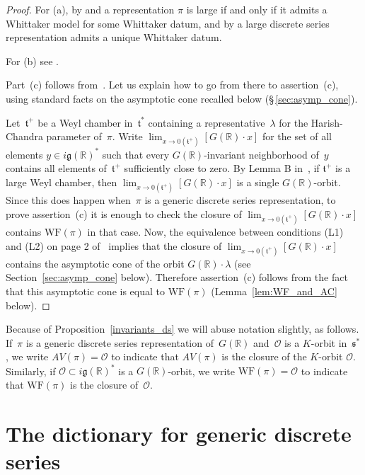 \documentclass[cupthm]{CUP-JNL-JMJ}
\numberwithin{equation}{section}
\theoremstyle{cupplain}
\theoremstyle{cupdefinition}
\theoremstyle{cupremark}
\theoremstyle{cupproof}
\newtheorem{proof}{Proof}
\renewcommand{\O}{\mathcal O}
\newcommand{\R}{\mathbb R}
\newcommand{\g}{\mathfrak g}
\newcommand{\s}{\mathfrak s}
\newcommand{\WF}{\mathrm{WF}}
\begin{document}
\begin{proof} For (a), by \cite{vogan-gelfand-kirillov} and \cite{kostant_whittaker}
a representation $\pi$ is large if and only if it admits a Whittaker model for some Whittaker datum,
and by \cite[Lemma 14.14]{abv} a  large discrete series representation admits a unique Whittaker datum.

For (b) see \cite[Proposition A.9]{AV1}.

Part~(c) follows from~\cite[Lemma B]{rossmann_limit_orbits}. Let us explain how to go from there to  assertion~(c), using standard facts on the asymptotic cone recalled below (\S\,{}\ref{sec:asymp_cone}).

Let~$\mathfrak{t}^+$ be a Weyl chamber in~$\mathfrak{t}^\ast$ containing a representative~$\lambda$ for the Harish-Chandra parameter of~$\pi$. Write $\lim_{x \to 0(\mathfrak{t}^+)}\left[ G(\R)\cdot x\right]$ for the set of all elements $y \in i\g(\R)^\ast$ such that every $G(\R)$-invariant neighborhood of~$y$ contains all elements of~$\mathfrak{t}^+$ sufficiently close to zero. By Lemma B in~\cite{rossmann_limit_orbits}, if $\mathfrak{t}^+$ is a large Weyl chamber, then $\lim_{x \to 0(\mathfrak{t}^+)} \left[G(\R)\cdot x\right]$ is a single $G(\R)$-orbit.  Since this does happen when~$\pi$ is a generic discrete series representation, to prove assertion~(c)  it is enough to check the closure of $\lim_{x \to 0(\mathfrak{t}^+)} \left[G(\R)\cdot x\right]$ contains $\WF(\pi)$ in that case. Now, the equivalence between conditions  (L1) and (L2) on page 2 of~\cite{rossmann_limit_orbits} implies that the closure of $\lim_{x \to 0(\mathfrak{t}^+)} \left[G(\R)\cdot x\right]$ contains the asymptotic cone of the orbit $G(\R)\cdot \lambda$  (see  Section~\ref{sec:asymp_cone} below). Therefore assertion~(c) follows from the fact that this asymptotic cone is equal to  $\WF(\pi)$  (Lemma~\ref{lem:WF_and_AC} below).
\end{proof}

Because of Proposition~\ref{invariants_ds} we will abuse notation slightly, as follows. If~$\pi$ is a generic discrete series representation of~$G(\R)$ and~$\O$ is a $K$-orbit in~$\s^\ast$, we write $AV(\pi)=\O$ to indicate that $AV(\pi)$ is the closure of the $K$-orbit $\O$. 
Similarly, if $\O\subset i\g(\R)^*$ is a $G(\R)$-orbit, we write $\WF(\pi)=\O$ to indicate that $\WF(\pi)$ is the closure of~$\O$. 



\section{The dictionary for generic discrete series}
\end{document}

